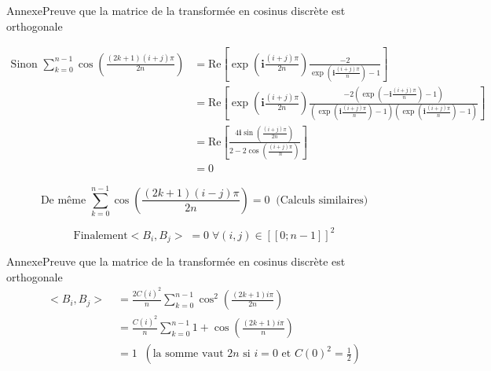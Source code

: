 \begin{frame}{Annexe}{Preuve que la matrice de la transformée en cosinus discrète est orthogonale}
    \tiny{

    \begin{align*}
        \textrm{Sinon } \sum_{k = 0}^{n-1}\cos\left(\frac{(2k+1)(i+j)\pi}{2n}\right) &= \mbox{Re}\!\left[ \exp\left(\mathbf{i}\frac{(i+j)\pi}{2n}\right) \frac{-2}{\exp\left(\mathbf{i}\frac{(i+j)\pi}{n}\right) - 1}\right]\\
        &= \mbox{Re}\!\left[ \exp\left(\mathbf{i}\frac{(i+j)\pi}{2n}\right) \frac{-2\left(\exp\left(\mathbf{-i}\frac{(i+j)\pi}{n}\right) - 1\right)}{\left(\exp\left(\mathbf{i}\frac{(i+j)\pi}{n}\right) - 1\right)\left(\exp\left(\mathbf{i}\frac{(i+j)\pi}{n}\right) - 1\right)}\right]\\
        &= \mbox{Re}\!\left[ \frac{4\mathbf{i}\sin\left(\frac{(i+j)\pi}{2n}\right)}{2 - 2\cos\left(\frac{(i+j)\pi}{n}\right)}\right]\\
        &= 0
    \end{align*}

    \[\textrm{De même } \sum_{k = 0}^{n-1}\cos\left(\frac{(2k+1)(i-j)\pi}{2n}\right) = 0 \;\; \textrm{(Calculs similaires)}\] 

    \[\textrm{Finalement} <B_i,B_j> \;= 0 \;\forall (i,j) \in [\![0;n-1]\!]^2\]

    }
\end{frame}
\begin{frame}{Annexe}{Preuve que la matrice de la transformée en cosinus discrète est orthogonale}
    \footnotesize{
    \begin{align*}
        <B_i,B_j> \;&= \frac{2C(i)^2}{n}\sum_{k = 0}^{n-1}\cos^2\left(\frac{(2k+1)i\pi}{2n}\right)\\
        &= \frac{C(i)^2}{n}\sum_{k = 0}^{n-1}1+\cos\left(\frac{(2k+1)i\pi}{n}\right)\\
        &= 1 \;\;\left(\textrm{la somme vaut } 2n \textrm{ si } i = 0 \textrm{ et } C(0)^2 = \frac{1}{2}\right)
    \end{align*}
    }
\end{frame}


